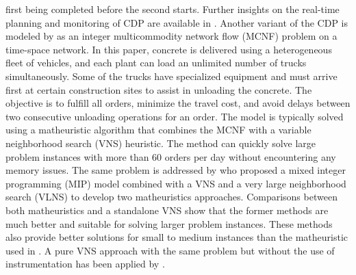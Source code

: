 \documentclass{article}
\begin{document}
first being completed before the second starts. Further insights on the real-time planning and monitoring of CDP are available in \cite{garza2021dynamic}. Another variant of the CDP is modeled by \cite{schmid2009hybrid} as an integer multicommodity network flow (MCNF) problem on a time-space network. In this paper, concrete is delivered using a heterogeneous fleet of vehicles, and each plant can load an unlimited number of trucks simultaneously. Some of the trucks have specialized equipment and must arrive first at certain construction sites to assist in unloading the concrete. The objective is to fulfill all orders, minimize the travel cost, and avoid delays between two consecutive unloading operations for an order. The model is typically solved using a matheuristic algorithm that combines the MCNF with a variable neighborhood search (VNS) heuristic. The method can quickly solve large problem instances with more than 60 orders per day without encountering any memory issues. The same problem is addressed by \cite{schmid2010hybridization} who proposed a mixed integer programming (MIP) model combined with a VNS and a very large neighborhood search (VLNS) to develop two matheuristics approaches. Comparisons between both matheuristics and a standalone VNS show that the former methods are much better and suitable for solving larger problem instances. These methods also provide better solutions for small to medium instances than the matheuristic used in \cite{schmid2009hybrid}. A pure VNS approach with the same problem but without the use of instrumentation has been applied by \cite{payr2009optimizing}.
\end{document}
